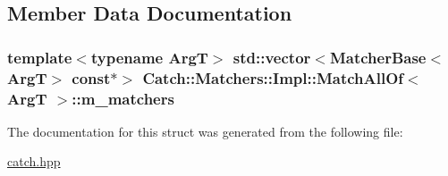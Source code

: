 \subsection{Member Data Documentation}
\hypertarget{struct_catch_1_1_matchers_1_1_impl_1_1_match_all_of_a98d6a2611f195a4a5c49f92fd877be9a}{
\subsubsection[{m\-\_\-matchers}]{\setlength{\rightskip}{0pt plus 5cm}template$<$typename Arg\-T$>$ std\-::vector$<${\bf Matcher\-Base}$<$Arg\-T$>$ const$\ast$$>$ {\bf Catch\-::\-Matchers\-::\-Impl\-::\-Match\-All\-Of}$<$ Arg\-T $>$\-::m\-\_\-matchers}}\label{struct_catch_1_1_matchers_1_1_impl_1_1_match_all_of_a98d6a2611f195a4a5c49f92fd877be9a}


The documentation for this struct was generated from the following file\-:\begin{DoxyCompactItemize}
\item 
\hyperlink{catch_8hpp}{catch.\-hpp}\end{DoxyCompactItemize}
